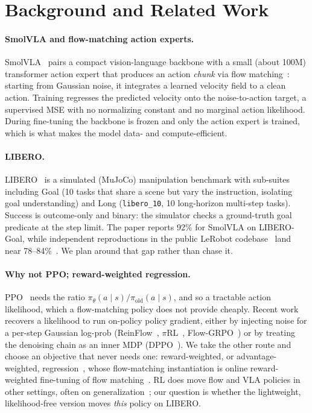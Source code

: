 \documentclass[11pt]{article}
\newcommand{\libgoal}{LIBERO-Goal}
\newcommand{\libten}{\texttt{libero\_10}}
\begin{document}
\section{Background and Related Work}

\paragraph{SmolVLA and flow-matching action experts.}
SmolVLA~\citep{shukor2025smolvla} pairs a compact vision-language backbone with a small (about
100M) transformer action expert that produces an action \emph{chunk} via flow
matching~\citep{lipman2023flow}: starting from Gaussian noise, it integrates a learned velocity
field to a clean action. Training regresses the predicted velocity onto the noise-to-action
target, a supervised MSE with no normalizing constant and no marginal action likelihood. During
fine-tuning the backbone is frozen and only the action expert is trained, which is what makes the
model data- and compute-efficient.

\paragraph{LIBERO.}
LIBERO~\citep{liu2023libero} is a simulated (MuJoCo) manipulation benchmark with sub-suites
including Goal (10 tasks that share a scene but vary the instruction, isolating goal understanding)
and Long (\libten{}, 10 long-horizon multi-step tasks). Success is outcome-only and binary: the
simulator checks a ground-truth goal predicate at the step limit. The paper reports 92\% for
SmolVLA on \libgoal{}, while independent reproductions in the public LeRobot
codebase~\citep{lerobot2024} land near 78--84\%~\citep{nanovla2025}. We plan around that gap rather
than chase it.

\paragraph{Why not PPO; reward-weighted regression.}
PPO~\citep{schulman2017ppo} needs the ratio $\pi_\theta(a\mid s)/\pi_{\text{old}}(a\mid s)$, and so
a tractable action likelihood, which a flow-matching policy does not provide cheaply. Recent work
recovers a likelihood to run on-policy policy gradient, either by injecting noise for a per-step
Gaussian log-prob (ReinFlow~\citep{reinflow2025}, $\pi$RL~\citep{chen2025pirl},
Flow-GRPO~\citep{flowgrpo2025}) or by treating the denoising chain as an inner MDP
(DPPO~\citep{ren2024dppo}). We take the other route and choose an objective that never needs one:
reward-weighted, or advantage-weighted, regression~\citep{peters2007rwr,peng2019awr}, whose
flow-matching instantiation is online reward-weighted fine-tuning of flow
matching~\citep{orwcfm2025}. RL does move flow and VLA policies in other settings, often on
generalization~\citep{simplevlarl2025,rftflow2025,chen2025pirl}; our question is whether the
lightweight, likelihood-free version moves \emph{this} policy on LIBERO.
\end{document}

